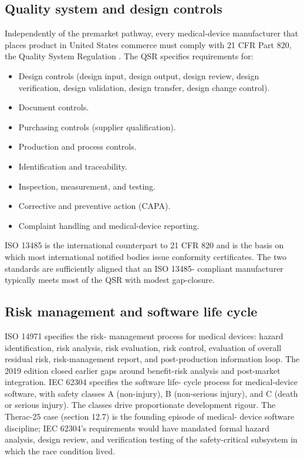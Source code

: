 \subsection{Quality system and design controls}

Independently of the premarket pathway, every medical-device
manufacturer that places product in United States commerce must
comply with 21 CFR Part 820, the Quality System Regulation
\cite{law:v6c12-21cfr-820}. The QSR specifies requirements for:

\begin{itemize}[leftmargin=*]
\item Design controls (design input, design output, design
  review, design verification, design validation, design
  transfer, design change control).
\item Document controls.
\item Purchasing controls (supplier qualification).
\item Production and process controls.
\item Identification and traceability.
\item Inspection, measurement, and testing.
\item Corrective and preventive action (CAPA).
\item Complaint handling and medical-device reporting.
\end{itemize}

ISO 13485 \cite{std:v6c12-iso-13485-2016} is the international
counterpart to 21 CFR 820 and is the basis on which most
international notified bodies issue conformity certificates. The
two standards are sufficiently aligned that an ISO 13485-
compliant manufacturer typically meets most of the QSR with
modest gap-closure.

\subsection{Risk management and software life cycle}

ISO 14971 \cite{std:v6c12-iso-14971-2019} specifies the risk-
management process for medical devices: hazard identification,
risk analysis, risk evaluation, risk control, evaluation of
overall residual risk, risk-management report, and post-production
information loop. The 2019 edition closed earlier gaps around
benefit-risk analysis and post-market integration. IEC 62304
\cite{std:v6c12-iec-62304-2015} specifies the software life-
cycle process for medical-device software, with safety classes A
(non-injury), B (non-serious injury), and C (death or serious
injury). The classes drive proportionate development rigour. The
Therac-25 case (section 12.7) is the founding episode of medical-
device software discipline; IEC 62304's requirements would have
mandated formal hazard analysis, design review, and verification
testing of the safety-critical subsystem in which the race
condition lived.

